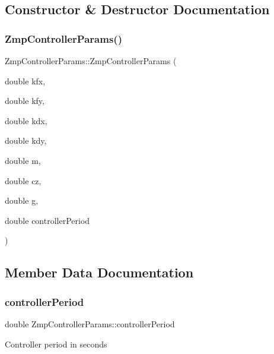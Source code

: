 \subsection{Constructor \& Destructor Documentation}
\hypertarget{structZmpControllerParams_a4f31bfd3657a479f89fd9c8fb5c8cdf4}{}\label{structZmpControllerParams_a4f31bfd3657a479f89fd9c8fb5c8cdf4} 
\subsubsection{\texorpdfstring{Zmp\+Controller\+Params()}{ZmpControllerParams()}}
{\footnotesize\ttfamily Zmp\+Controller\+Params\+::\+Zmp\+Controller\+Params (\begin{DoxyParamCaption}\item[{double}]{kfx,  }\item[{double}]{kfy,  }\item[{double}]{kdx,  }\item[{double}]{kdy,  }\item[{double}]{m,  }\item[{double}]{cz,  }\item[{double}]{g,  }\item[{double}]{controller\+Period }\end{DoxyParamCaption})\hspace{0.3cm}{\ttfamily [inline]}}



\subsection{Member Data Documentation}
\hypertarget{structZmpControllerParams_a495732ae992cece73c131d04f9ab0cb2}{}\label{structZmpControllerParams_a495732ae992cece73c131d04f9ab0cb2} 
\subsubsection{\texorpdfstring{controller\+Period}{controllerPeriod}}
{\footnotesize\ttfamily double Zmp\+Controller\+Params\+::controller\+Period}

Controller period in seconds \hypertarget{structZmpControllerParams_ad9ebbe3027001ce1600a8ac556061f7e}{}\label{structZmpControllerParams_ad9ebbe3027001ce1600a8ac556061f7e} 
